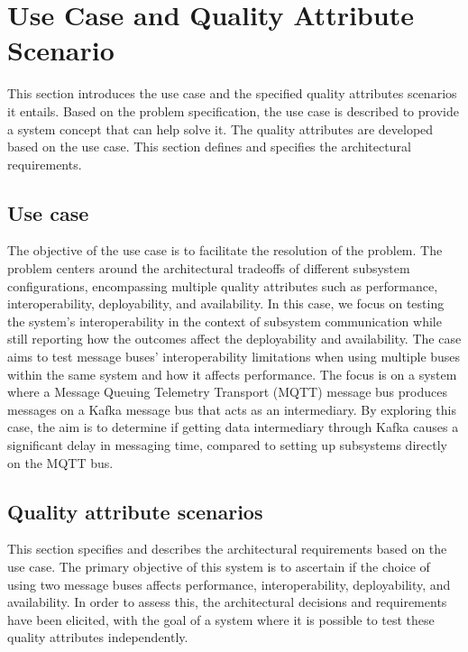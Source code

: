 \section{Use Case and Quality Attribute Scenario}
\label{sec:use_case_and_qas}
This section introduces the use case and the specified quality attributes scenarios it entails. Based on the problem specification, the use case is described to provide a system concept that can help solve it. The quality attributes are developed based on the use case. This section defines and specifies the architectural requirements.

\subsection{Use case}
\label{sec:use_case}
The objective of the use case is to facilitate the resolution of the problem. The problem centers around the architectural tradeoffs of different subsystem configurations, encompassing multiple quality attributes such as performance, interoperability, deployability, and availability. 
\noindent In this case, we focus on testing the system's interoperability in the context of subsystem communication while still reporting how the outcomes affect the deployability and availability. The case aims to test message buses' interoperability limitations when using multiple buses within the same system and how it affects performance. The focus is on a system where a Message Queuing Telemetry Transport (MQTT) message bus produces messages on a Kafka message bus that acts as an intermediary. By exploring this case, the aim is to determine if getting data intermediary through Kafka causes a significant delay in messaging time, compared to setting up subsystems directly on the MQTT bus.

\subsection{Quality attribute scenarios}
\label{sec:qas}
This section specifies and describes the architectural requirements based on the use case.
The primary objective of this system is to ascertain if the choice of using two message buses affects performance, interoperability, deployability, and availability. In order to assess this, the architectural decisions and requirements have been elicited, with the goal of a system where it is possible to test these quality attributes independently.



